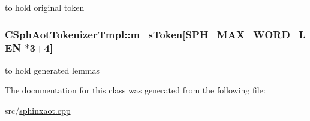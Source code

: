 to hold original token 

\hypertarget{classCSphAotTokenizerTmpl_a83ceca1f2abf18599dc9a4ac056bd44e}{
\subsubsection[{m\-\_\-s\-Token}]{ C\-Sph\-Aot\-Tokenizer\-Tmpl\-::m\-\_\-s\-Token\mbox{[}{\bf S\-P\-H\-\_\-\-M\-A\-X\-\_\-\-W\-O\-R\-D\-\_\-\-L\-E\-N} $\ast$3+4\mbox{]}\hspace{0.3cm}{\ttfamily [protected]}}}\label{classCSphAotTokenizerTmpl_a83ceca1f2abf18599dc9a4ac056bd44e}


to hold generated lemmas 



The documentation for this class was generated from the following file\-:\begin{DoxyCompactItemize}
\item 
src/\hyperlink{sphinxaot_8cpp}{sphinxaot.\-cpp}\end{DoxyCompactItemize}
